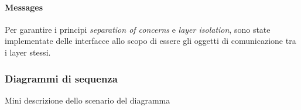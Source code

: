\paragraph{Messages}
Per garantire i principi \textit{separation of concerns} e \textit{layer isolation}, sono state implementate delle interfacce allo scopo di essere gli oggetti di comunicazione tra i layer stessi. \\


\subsubsection{Diagrammi di sequenza}
Mini descrizione dello scenario del diagramma
